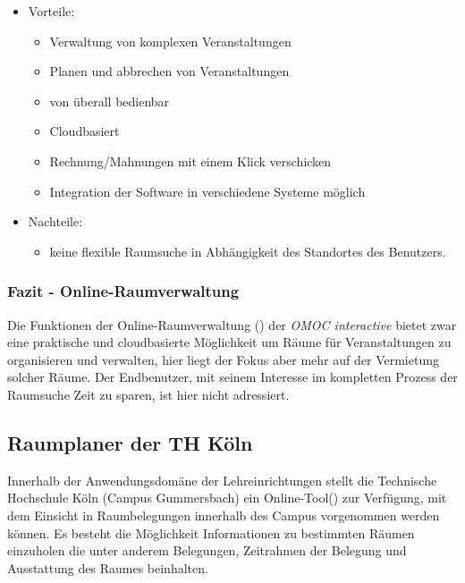 \begin{itemize}
	\item Vorteile:
		\begin{itemize}
			\item Verwaltung von komplexen Veranstaltungen
			\item Planen und abbrechen von Veranstaltungen
			\item von überall bedienbar
			\item Cloudbasiert
			\item Rechnung/Mahnungen mit einem Klick verschicken
			\item Integration der Software in verschiedene Systeme möglich
		\end{itemize}
	\item Nachteile:
		\begin{itemize}
			\item keine flexible Raumsuche in Abhängigkeit des Standortes des Benutzers.
		\end{itemize}
\end{itemize}

\subsubsection{Fazit - Online-Raumverwaltung}
\label{sec:Online-Raumverwaltung}

Die Funktionen der Online-Raumverwaltung (\citep{OnRaum}) der
\textit{OMOC interactive} bietet zwar eine praktische und cloudbasierte
Möglichkeit um Räume für Veranstaltungen zu organisieren und verwalten, hier
liegt der Fokus aber mehr auf der Vermietung solcher Räume. Der Endbenutzer,
mit seinem Interesse im kompletten Prozess der Raumsuche Zeit zu sparen, ist
hier nicht adressiert.   

\subsection{Raumplaner der TH Köln}
\label{sec:Raumplaner der TH Köln}

Innerhalb der Anwendungsdomäne der Lehreinrichtungen stellt die 
Technische Hochschule Köln (Campus Gummersbach) ein Online-Tool(\cite{THK-OnlineTool})
zur Verfügung, mit dem Einsicht in Raumbelegungen innerhalb des Campus
vorgenommen werden können. Es besteht die Möglichkeit Informationen zu
bestimmten Räumen einzuholen die unter anderem Belegungen, Zeitrahmen der
Belegung und Ausstattung des Raumes beinhalten.

